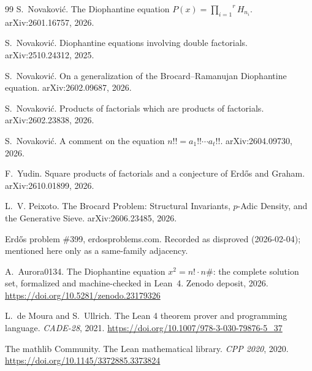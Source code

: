 \documentclass[11pt]{article}
\theoremstyle{definition}
\begin{document}
\begin{thebibliography}{99}
S.~Novakovi\'c.
\newblock The Diophantine equation $P(x)=\overset{r}{\underset{i=1}{\prod}}H_{n_i}$.
\newblock arXiv:2601.16757, 2026.

S.~Novakovi\'c.
\newblock Diophantine equations involving double factorials.
\newblock arXiv:2510.24312, 2025.

S.~Novakovi\'c.
\newblock On a generalization of the Brocard--Ramanujan Diophantine equation.
\newblock arXiv:2602.09687, 2026.

S.~Novakovi\'c.
\newblock Products of factorials which are products of factorials.
\newblock arXiv:2602.23838, 2026.

S.~Novakovi\'c.
\newblock A comment on the equation $n!!=a_1!!\cdots a_t!!$.
\newblock arXiv:2604.09730, 2026.

F.~Yudin.
\newblock Square products of factorials and a conjecture of Erd\H{o}s and Graham.
\newblock arXiv:2610.01899, 2026.

L.~V. Peixoto.
\newblock The Brocard Problem: Structural Invariants, $p$-Adic Density, and the Generative Sieve.
\newblock arXiv:2606.23485, 2026.

Erd\H{o}s problem \#399, erdosproblems.com. Recorded as disproved
(2026-02-04); mentioned here only as a same-family adjacency.

A.~Aurora0134.
\newblock The Diophantine equation $x^2 = n! \cdot n\#$: the complete solution
set, formalized and machine-checked in Lean~4.
\newblock Zenodo deposit, 2026. \url{https://doi.org/10.5281/zenodo.23179326}

L.~de Moura and S.~Ullrich.
\newblock The Lean 4 theorem prover and programming language.
\newblock \emph{CADE-28}, 2021. \url{https://doi.org/10.1007/978-3-030-79876-5_37}

The mathlib Community.
\newblock The Lean mathematical library.
\newblock \emph{CPP 2020}, 2020. \url{https://doi.org/10.1145/3372885.3373824}
\end{thebibliography}
\end{document}

